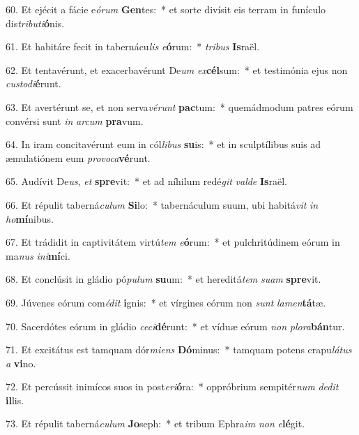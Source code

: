 60. Et ejécit a fácie e\textit{ó}\textit{rum} \textbf{Gen}tes:~*  et sorte divísit eis terram in funículo dis\textit{tri}\textit{bu}\textit{ti}\textbf{ó}nis.\

61. Et habitáre fecit in tabernácu\textit{lis} \textit{e}\textbf{ó}rum:~*  \textit{tri}\textit{bus} \textbf{Is}raël.\

62. Et tentavérunt, et exacerbavérunt De\textit{um} \textit{ex}\textbf{cél}sum:~*  et testimónia ejus non \textit{cus}\textit{to}\textit{di}\textbf{é}runt.\

63. Et avertérunt se, et non serva\textit{vé}\textit{runt} \textbf{pac}tum:~*  quemádmodum patres eórum convérsi sunt \textit{in} \textit{ar}\textit{cum} \textbf{pra}vum.\

64. In iram concitavérunt eum in cól\textit{li}\textit{bus} \textbf{su}is:~*  et in sculptílibus suis ad æmulatiónem eum \textit{pro}\textit{vo}\textit{ca}\textbf{vé}runt.\

65. Audívit De\textit{us}, \textit{et} \textbf{spre}vit:~*  et ad níhilum redé\textit{git} \textit{val}\textit{de} \textbf{Is}raël.\

66. Et répulit taberná\textit{cu}\textit{lum} \textbf{Si}lo:~*  tabernáculum suum, ubi habitá\textit{vit} \textit{in} \textit{ho}\textbf{mí}nibus.\

67. Et trádidit in captivitátem virtú\textit{tem} \textit{e}\textbf{ó}rum:~*  et pulchritúdinem eórum in ma\textit{nus} \textit{in}\textit{i}\textbf{mí}ci.\

68. Et conclúsit in gládio pó\textit{pu}\textit{lum} \textbf{su}um:~*  et hereditá\textit{tem} \textit{su}\textit{am} \textbf{spre}vit.\

69. Júvenes eórum com\textit{é}\textit{dit} \textbf{i}gnis:~*  et vírgines eórum non \textit{sunt} \textit{la}\textit{men}\textbf{tá}tæ.\

70. Sacerdótes eórum in gládio \textit{ce}\textit{ci}\textbf{dé}runt:~*  et víduæ eórum \textit{non} \textit{plo}\textit{ra}\textbf{bán}tur.\

71. Et excitátus est tamquam dór\textit{mi}\textit{ens} \textbf{Dó}minus:~*  tamquam potens crapu\textit{lá}\textit{tus} \textit{a} \textbf{vi}no.\

72. Et percússit inimícos suos in post\textit{e}\textit{ri}\textbf{ó}ra:~*  oppróbrium sempitér\textit{num} \textit{de}\textit{dit} \textbf{il}lis.\

73. Et répulit taberná\textit{cu}\textit{lum} \textbf{Jo}seph:~*  et tribum Ephra\textit{im} \textit{non} \textit{e}\textbf{lé}git.\

